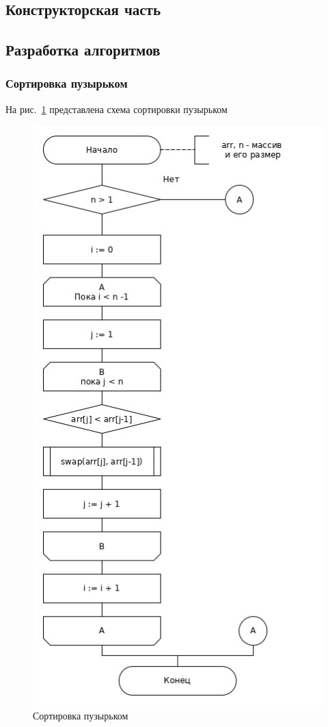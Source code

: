 \documentclass[a4paper,12pt]{article}
\begin{document}
    \begin{center}
        \section{Конструкторская часть}
        \subsection{Разработка алгоритмов}
        \subsubsection{Сортировка пузырьком}
    \end{center}
    На рис.~\ref{ris:rec_sheme} представлена схема сортировки пузырьком
		 		\begin{figure}[h]
		 			\centering
		 			{
		 				\includegraphics[scale=0.51]{buble.png}
		 				\caption{Сортировка пузырьком}
			 			\label{ris:rec_sheme}
		 			}
		 		\end{figure}
	
\end{document}
